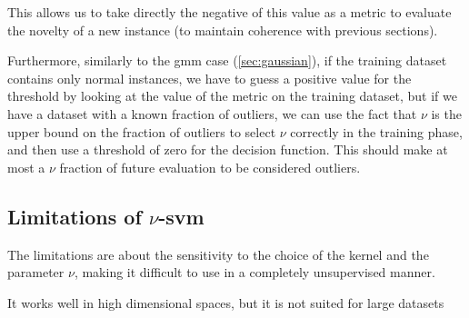 This allows us to take directly the negative of this value as a metric to evaluate the novelty of a new instance (to maintain coherence with previous sections). 

Furthermore, similarly to the \gls{gmm} case (\autoref{sec:gaussian}), if the training dataset contains only normal instances, we have to guess a positive value for the threshold by looking at the value of the metric on the training dataset, but if we have a dataset with a known fraction of outliers, we can use the fact that $\nu$ is the upper bound on the fraction of outliers to select $\nu$ correctly in the training phase, and then use a threshold of zero for the decision function. This should make at most a $\nu$ fraction of future evaluation to be considered outliers.

\subsection{Limitations of $\nu$-\gls{svm}}

The limitations are about the sensitivity to the choice of the kernel and the parameter $\nu$, making it difficult to use in a completely unsupervised manner. 

It works well in high dimensional spaces, but it is not suited for large datasets 